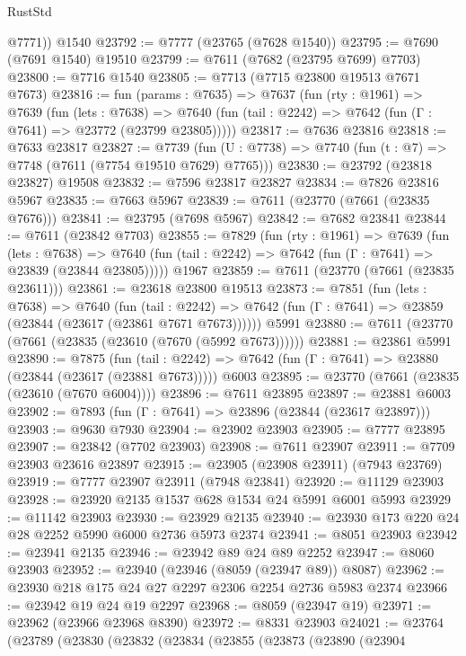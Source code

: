 \begin{lexlean}{RustStd}
\begin{coremodule}
        @7771))
    @1540
@23792 := @7777 (@23765 (@7628 @1540))
@23795 := @7690 (@7691 @1540) @19510
@23799 := @7611 (@7682 (@23795 @7699) @7703)
@23800 := @7716 @1540
@23805 := @7713 (@7715 @23800 @19513 @7671 @7673)
@23816 := fun (params : @7635) =>
  @7637
    (fun (rty : @1961) =>
    @7639
      (fun (lets : @7638) =>
      @7640 (fun (tail : @2242) => @7642 (fun (Γ : @7641) => @23772 (@23799 @23805)))))
@23817 := @7636 @23816
@23818 := @7633 @23817
@23827 := @7739
    (fun (U : @7738) => @7740 (fun (t : @7) => @7748 (@7611 (@7754 @19510 @7629) @7765)))
@23830 := @23792 (@23818 @23827) @19508
@23832 := @7596 @23817 @23827
@23834 := @7826 @23816 @5967
@23835 := @7663 @5967
@23839 := @7611 (@23770 (@7661 (@23835 @7676)))
@23841 := @23795 (@7698 @5967)
@23842 := @7682 @23841
@23844 := @7611 (@23842 @7703)
@23855 := @7829
    (fun (rty : @1961) =>
    @7639
      (fun (lets : @7638) =>
      @7640 (fun (tail : @2242) => @7642 (fun (Γ : @7641) => @23839 (@23844 @23805)))))
    @1967
@23859 := @7611 (@23770 (@7661 (@23835 @23611)))
@23861 := @23618 @23800 @19513
@23873 := @7851
    (fun (lets : @7638) =>
    @7640
      (fun (tail : @2242) =>
      @7642 (fun (Γ : @7641) => @23859 (@23844 (@23617 (@23861 @7671 @7673))))))
    @5991
@23880 := @7611 (@23770 (@7661 (@23835 (@23610 (@7670 (@5992 @7673))))))
@23881 := @23861 @5991
@23890 := @7875
    (fun (tail : @2242) => @7642 (fun (Γ : @7641) => @23880 (@23844 (@23617 (@23881 @7673)))))
    @6003
@23895 := @23770 (@7661 (@23835 (@23610 (@7670 @6004))))
@23896 := @7611 @23895
@23897 := @23881 @6003
@23902 := @7893 (fun (Γ : @7641) => @23896 (@23844 (@23617 @23897)))
@23903 := @9630 @7930
@23904 := @23902 @23903
@23905 := @7777 @23895
@23907 := @23842 (@7702 @23903)
@23908 := @7611 @23907
@23911 := @7709 @23903 @23616 @23897
@23915 := @23905 (@23908 @23911) (@7943 @23769)
@23919 := @7777 @23907 @23911 (@7948 @23841)
@23920 := @11129 @23903
@23928 := @23920 @2135 @1537 @628 @1534 @24 @5991 @6001 @5993
@23929 := @11142 @23903
@23930 := @23929 @2135
@23940 := @23930 @173 @220 @24 @28 @2252 @5990 @6000 @2736 @5973 @2374
@23941 := @8051 @23903
@23942 := @23941 @2135
@23946 := @23942 @89 @24 @89 @2252
@23947 := @8060 @23903
@23952 := @23940 (@23946 (@8059 (@23947 @89)) @8087)
@23962 := @23930 @218 @175 @24 @27 @2297 @2306 @2254 @2736 @5983 @2374
@23966 := @23942 @19 @24 @19 @2297
@23968 := @8059 (@23947 @19)
@23971 := @23962 (@23966 @23968 @8390)
@23972 := @8331 @23903
@24021 := @23764
    (@23789
      (@23830
        (@23832
          (@23834
            (@23855
              (@23873
                (@23890
                  (@23904

\end{coremodule}
\end{lexlean}
